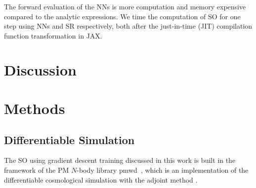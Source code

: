 \documentclass[modern, trackchanges, dvipsnames]{aastex631}
\newcommand{\pmwd}{{\usefont{T1}{nova}{m}{sl}pmwd}}
\begin{document}
The forward evaluation of the NNs is more computation and memory
expensive compared to the analytic expressions.
We time the computation of SO for one step using NNs and SR
respectively, both after the just-in-time (JIT) compilation function
transformation in JAX.


\vspace{1em}
\section{Discussion}


\vspace{1em}
\section{Methods}


\vspace{1em}
\subsection{Differentiable Simulation}
\label{sec:pmwd}

The SO using gradient descent training discussed in this work is built
in the framework of the PM $N$-body library \pmwd\ \citep{Li2022b},
which is an implementation of the differentiable cosmological simulation
with the adjoint method \citep{Li2022a}.
\end{document}
